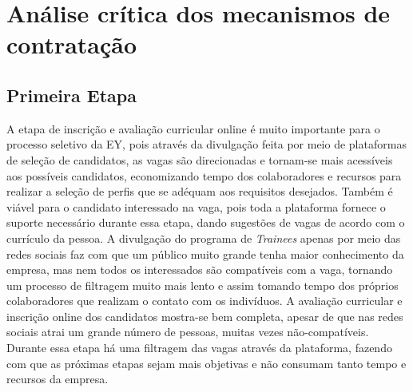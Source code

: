 \chapter[Crítica]{Análise crítica dos mecanismos de contratação}

\section{Primeira Etapa}

A etapa de inscrição e avaliação curricular online é muito importante para o processo seletivo da EY, pois através da divulgação feita por meio de plataformas de seleção de candidatos, as vagas são direcionadas e tornam-se mais acessíveis aos possíveis candidatos, economizando tempo dos colaboradores e recursos para realizar a seleção de perfis que se adéquam aos requisitos desejados. Também é viável para o candidato interessado na vaga, pois toda a plataforma fornece o suporte necessário durante essa etapa, dando sugestões de vagas de acordo com o currículo da pessoa. A divulgação do programa de \textit{Trainees} apenas por meio das redes sociais faz com que um público muito grande tenha maior conhecimento da empresa, mas nem todos os interessados são compatíveis com a vaga, tornando um processo de filtragem muito mais lento e assim tomando tempo dos próprios colaboradores que realizam o contato com os indivíduos.
A avaliação curricular e inscrição online dos candidatos mostra-se bem completa, apesar de que nas redes sociais atrai um grande número de pessoas, muitas vezes não-compatíveis. Durante essa etapa há uma filtragem das vagas através da plataforma, fazendo com que as próximas etapas sejam mais objetivas e não consumam tanto tempo e recursos da empresa. 



